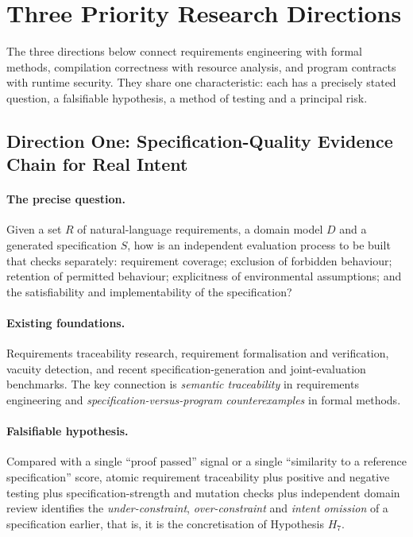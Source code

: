 \section{Three Priority Research Directions}

The three directions below connect requirements engineering with formal methods,
compilation correctness with resource analysis, and program contracts with runtime
security. They share one characteristic: each has a precisely stated question, a
falsifiable hypothesis, a method of testing and a principal risk.

\subsection*{Direction One: Specification-Quality Evidence Chain for Real Intent}

\paragraph{The precise question.}
Given a set $R$ of natural-language requirements, a domain model $D$ and a generated
specification $S$, how is an independent evaluation process to be built that checks
separately: requirement coverage; exclusion of forbidden behaviour; retention of permitted
behaviour; explicitness of environmental assumptions; and the satisfiability and
implementability of the specification?

\paragraph{Existing foundations.}
Requirements traceability research, requirement formalisation and verification, vacuity
detection, and recent specification-generation and joint-evaluation benchmarks. The key
connection is \emph{semantic traceability} in requirements engineering and
\emph{specification-versus-program counterexamples} in formal methods.

\paragraph{Falsifiable hypothesis.}
Compared with a single ``proof passed'' signal or a single ``similarity to a reference
specification'' score, atomic requirement traceability plus positive and negative testing
plus specification-strength and mutation checks plus independent domain review identifies
the \emph{under-constraint}, \emph{over-constraint} and \emph{intent omission} of a
specification earlier, that is, it is the concretisation of Hypothesis $H_7$.


